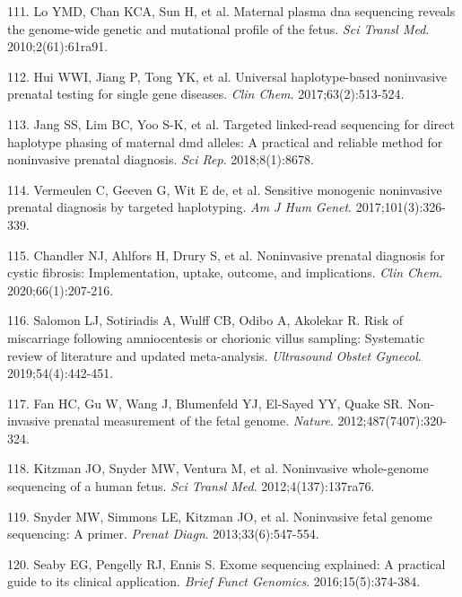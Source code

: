 \documentclass[11pt,letterpaper]{book}
\begin{document}
\leavevmode\hypertarget{ref-lo:2010aa}{}%
111. Lo YMD, Chan KCA, Sun H, et al. Maternal plasma dna sequencing reveals the genome-wide genetic and mutational profile of the fetus. \emph{Sci Transl Med}. 2010;2(61):61ra91.

\leavevmode\hypertarget{ref-hui:2017aa}{}%
112. Hui WWI, Jiang P, Tong YK, et al. Universal haplotype-based noninvasive prenatal testing for single gene diseases. \emph{Clin Chem}. 2017;63(2):513-524.

\leavevmode\hypertarget{ref-jang:2018aa}{}%
113. Jang SS, Lim BC, Yoo S-K, et al. Targeted linked-read sequencing for direct haplotype phasing of maternal dmd alleles: A practical and reliable method for noninvasive prenatal diagnosis. \emph{Sci Rep}. 2018;8(1):8678.

\leavevmode\hypertarget{ref-vermeulen:2017aa}{}%
114. Vermeulen C, Geeven G, Wit E de, et al. Sensitive monogenic noninvasive prenatal diagnosis by targeted haplotyping. \emph{Am J Hum Genet}. 2017;101(3):326-339.

\leavevmode\hypertarget{ref-chandler:2020aa}{}%
115. Chandler NJ, Ahlfors H, Drury S, et al. Noninvasive prenatal diagnosis for cystic fibrosis: Implementation, uptake, outcome, and implications. \emph{Clin Chem}. 2020;66(1):207-216.

\leavevmode\hypertarget{ref-salomon:2019aa}{}%
116. Salomon LJ, Sotiriadis A, Wulff CB, Odibo A, Akolekar R. Risk of miscarriage following amniocentesis or chorionic villus sampling: Systematic review of literature and updated meta-analysis. \emph{Ultrasound Obstet Gynecol}. 2019;54(4):442-451.

\leavevmode\hypertarget{ref-fan:2012aa}{}%
117. Fan HC, Gu W, Wang J, Blumenfeld YJ, El-Sayed YY, Quake SR. Non-invasive prenatal measurement of the fetal genome. \emph{Nature}. 2012;487(7407):320-324.

\leavevmode\hypertarget{ref-kitzman:2012aa}{}%
118. Kitzman JO, Snyder MW, Ventura M, et al. Noninvasive whole-genome sequencing of a human fetus. \emph{Sci Transl Med}. 2012;4(137):137ra76.

\leavevmode\hypertarget{ref-snyder:2013aa}{}%
119. Snyder MW, Simmons LE, Kitzman JO, et al. Noninvasive fetal genome sequencing: A primer. \emph{Prenat Diagn}. 2013;33(6):547-554.

\leavevmode\hypertarget{ref-seaby:2016aa}{}%
120. Seaby EG, Pengelly RJ, Ennis S. Exome sequencing explained: A practical guide to its clinical application. \emph{Brief Funct Genomics}. 2016;15(5):374-384.
\end{document}
